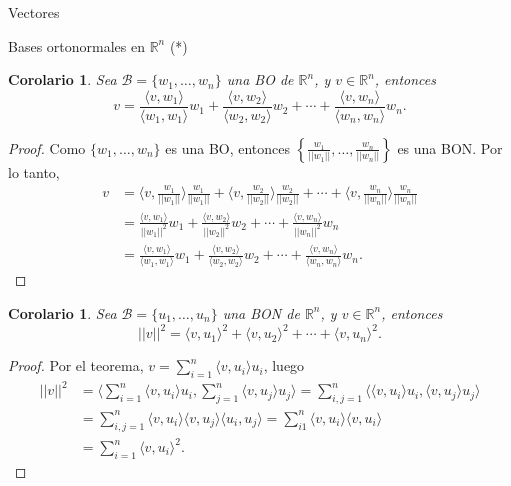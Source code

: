 \documentclass[a4paper,12pt,twoside,spanish,reqno]{amsbook}
\numberwithin{equation}{section}
\newtheorem{corolario}[teorema]{Corolario}
\theoremstyle{definition}
\theoremstyle{remark}
\newcommand{\la}{\langle}
\newcommand{\ra}{\rangle}
\newcommand{\R}{\mathbb R}
\begin{document}
\begin{chapter}{Vectores}
\begin{section}{Bases ortonormales en $\R^n$ (*)}
    \begin{corolario}\label{cor-gm-rn-1}
        Sea $\mathcal B =\{w_1,\ldots,w_n\}$ una BO de $\R^n$, y $v \in \R^n$, entonces
        \begin{equation*}
            v = \frac{\la v,w_1\ra}{ \la w_1, w_1\ra} w_1 +\frac{\la v,w_2\ra}{\la w_2, w_2\ra} w_2 +\cdots+\frac{\la v,w_n\ra}{\la w_n, w_n\ra} w_n. 
        \end{equation*} 
    \end{corolario}
    \begin{proof}
        Como $\{w_1,\ldots,w_n\}$ es una BO,  entonces 
        $\displaystyle\left\{\frac{w_1}{|| w_1||},\ldots,\frac{w_n}{|| w_n||}\right\}$ es una BON. Por lo tanto, 
        \begin{align*}
            v &= \la v,\frac{w_1}{|| w_1||}\ra \frac{w_1}{|| w_1||} +\la v,\frac{w_2}{|| w_2||}\ra \frac{w_2}{|| w_2||}
             +\cdots+\la v,\frac{w_n}{|| w_n||}\ra \frac{w_n}{|| w_n||} \\
             &=  \frac{\la v,w_1\ra}{|| w_1||^2} w_1 +\frac{\la v,w_2\ra}{|| w_2||^2} w_2 +\cdots+\frac{\la v,w_n\ra}{|| w_n||^2} w_n \\
             &= \frac{\la v,w_1\ra}{ \la w_1, w_1\ra} w_1 +\frac{\la v,w_2\ra}{\la w_2, w_2\ra} w_2 +\cdots+\frac{\la v,w_n\ra}{\la w_n, w_n\ra} w_n.
        \end{align*}
    \end{proof}

    \begin{corolario}
        Sea $\mathcal B =\{u_1,\ldots,u_n\}$ una BON de $\R^n$, y $v \in \R^n$, entonces
        \begin{equation*}
            ||v||^2 = \la v,u_1\ra^2 +\la v,u_2\ra^2  +\cdots+\la v,u_n\ra^2.
        \end{equation*} 
    \end{corolario}
    \begin{proof}
        Por el teorema, $v = \sum_{i=1}^n  \la v,u_i\ra u_i$, luego
        \begin{align*}
            ||v||^2 &= \la  \sum_{i=1}^n  \la v,u_i\ra u_i,  \sum_{j=1}^n  \la v,u_j\ra u_j \ra= \sum_{i,j=1}^n\la \la v,u_i\ra u_i,  \la v,u_j\ra u_j \ra \\
            &= \sum_{i,j=1}^n\la v,u_i\ra\la v,u_j\ra\la  u_i,   u_j \ra = \sum_{i1}^n\la v,u_i\ra\la v,u_i\ra\\
            &= \sum_{i=1}^n\la v,u_i\ra^2.
        \end{align*}


\end{proof}
\end{section}
\end{chapter}
\end{document}
